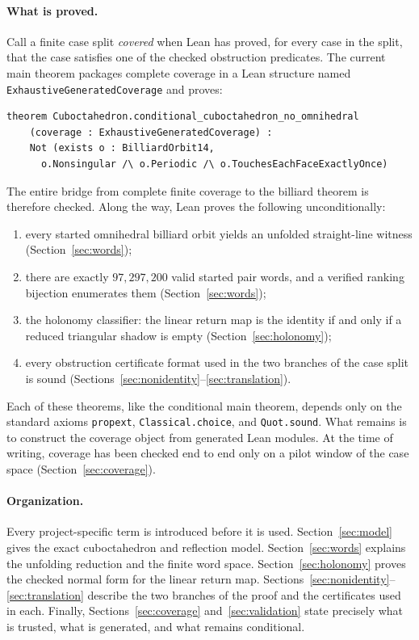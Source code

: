\documentclass[11pt]{article}
\begin{document}
\paragraph{What is proved.}
Call a finite case split \emph{covered} when Lean has proved, for every case
in the split, that the case satisfies one of the checked obstruction
predicates.  The current main theorem packages complete coverage in a Lean
structure named \texttt{ExhaustiveGeneratedCoverage} and proves:
\begin{verbatim}
theorem Cuboctahedron.conditional_cuboctahedron_no_omnihedral
    (coverage : ExhaustiveGeneratedCoverage) :
    Not (exists o : BilliardOrbit14,
      o.Nonsingular /\ o.Periodic /\ o.TouchesEachFaceExactlyOnce)
\end{verbatim}
The entire bridge from complete finite coverage to the billiard theorem is
therefore checked.  Along the way, Lean proves the following unconditionally:
\begin{enumerate}[leftmargin=2em]
\item every started omnihedral billiard orbit yields an unfolded
  straight-line witness (Section~\ref{sec:words});
\item there are exactly $97{,}297{,}200$ valid started pair words, and a
  verified ranking bijection enumerates them (Section~\ref{sec:words});
\item the holonomy classifier: the linear return map is the identity if and
  only if a reduced triangular shadow is empty (Section~\ref{sec:holonomy});
\item every obstruction certificate format used in the two branches of the
  case split is sound
  (Sections~\ref{sec:nonidentity}--\ref{sec:translation}).
\end{enumerate}
Each of these theorems, like the conditional main theorem, depends only on
the standard axioms \texttt{propext}, \texttt{Classical.choice}, and
\texttt{Quot.sound}.  What remains is to construct the coverage object from
generated Lean modules.  At the time of writing, coverage has been checked
end to end only on a pilot window of the case space
(Section~\ref{sec:coverage}).

\paragraph{Organization.}
Every project-specific term is introduced before it is used.
Section~\ref{sec:model} gives the exact cuboctahedron and reflection model.
Section~\ref{sec:words} explains the unfolding reduction and the finite word
space.  Section~\ref{sec:holonomy} proves the checked normal form for the
linear return map.  Sections~\ref{sec:nonidentity}--\ref{sec:translation}
describe the two branches of the proof and the certificates used in each.
Finally, Sections~\ref{sec:coverage} and~\ref{sec:validation} state precisely
what is trusted, what is generated, and what remains conditional.
\end{document}
